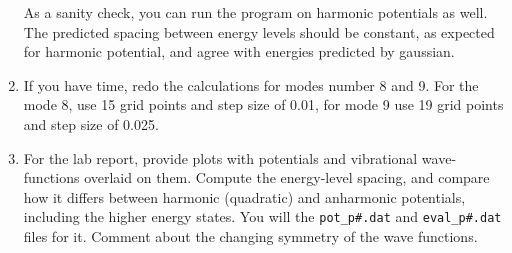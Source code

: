 \documentclass{tufte-handout}
\begin{document}
\begin{enumerate}
 As a sanity check, you can run the program on harmonic potentials as well. The predicted spacing between energy levels should be constant, as expected for harmonic potential, and agree with energies predicted by gaussian. 
 
 \item If you have time, redo the calculations for modes number 8 and 9. For the mode 8, use 15 grid points and step size of 0.01, for mode 9 use 19 grid points and step size of 0.025. 
 
 \item For the lab report, provide plots with potentials and vibrational wave-functions overlaid on them. Compute the energy-level spacing, and compare how it differs between harmonic (quadratic) and anharmonic potentials, including the higher energy states. You will the {\tt pot\_p\#.dat} and {\tt eval\_p\#.dat} files for it. Comment about the changing symmetry of the wave functions. 
 
\end{enumerate}


\end{document}
